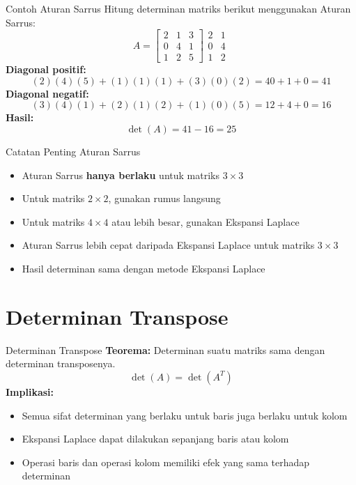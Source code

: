 \documentclass{beamer}
\begin{document}
\begin{frame}[t,fragile]{Contoh Aturan Sarrus}
Hitung determinan matriks berikut menggunakan Aturan Sarrus:
$$ A = \begin{bmatrix}
       	2 & 1 & 3 \\
	    0 & 4 & 1 \\
	    1 & 2 & 5
        \end{bmatrix} 
        \begin{matrix}
       	2 & 1 \\
	    0 & 4 \\
	    1 & 2
        \end{matrix} $$
\textbf{Diagonal positif:}
$$ (2)(4)(5) + (1)(1)(1) + (3)(0)(2) = 40 + 1 + 0 = 41 $$
\textbf{Diagonal negatif:}
$$ (3)(4)(1) + (2)(1)(2) + (1)(0)(5) = 12 + 4 + 0 = 16 $$
\textbf{Hasil:}
$$ \det(A) = 41 - 16 = 25 $$
\end{frame}

\begin{frame}[t,fragile]{Catatan Penting Aturan Sarrus}
\begin{itemize}
\item Aturan Sarrus \textbf{hanya berlaku} untuk matriks $3 \times 3$
\item Untuk matriks $2 \times 2$, gunakan rumus langsung
\item Untuk matriks $4 \times 4$ atau lebih besar, gunakan Ekspansi Laplace
\item Aturan Sarrus lebih cepat daripada Ekspansi Laplace untuk matriks $3 \times 3$
\item Hasil determinan sama dengan metode Ekspansi Laplace
\end{itemize}
\end{frame}

\section{Determinan Transpose}
\begin{frame}[t,fragile]{Determinan Transpose}
\textbf{Teorema:} Determinan suatu matriks sama dengan determinan transposenya.
$$ \det(A) = \det(A^T) $$
\vspace{0.3cm}
\textbf{Implikasi:}
\begin{itemize}
\item Semua sifat determinan yang berlaku untuk baris juga berlaku untuk kolom
\item Ekspansi Laplace dapat dilakukan sepanjang baris atau kolom
\item Operasi baris dan operasi kolom memiliki efek yang sama terhadap determinan
\end{itemize}
\end{frame}
\end{document}
